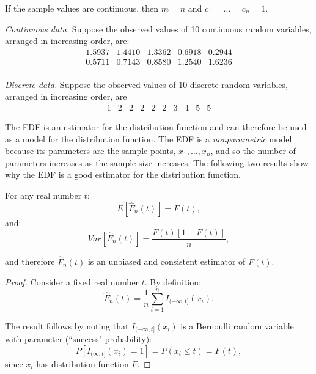 If the sample values are continuous, then $m = n$ and $c_1=\ldots=c_n=1$.

\begin{example}
{\it Continuous data.}
Suppose the observed values of 10 continuous random variables, arranged in increasing order, are:
$$\begin{array}{ccccc}
 1.5937     &   1.4410 &       1.3362&        0.6918 &      0.2944\\
0.5711	   &    0.7143&        0.8580&        1.2540  &      1.6236\\
\end{array}$$

\end{example}

\begin{example}
{\it Discrete data.}
Suppose the observed values of 10 discrete random variables, arranged in increasing order, are
$$\begin{array}{cccccccccc}
1 &    2&     2&     2&     2  &   2&     3&     4  &   5 &    5
\end{array}$$
\end{example}

The EDF is an estimator for the distribution function and can therefore be used as a model for the distribution function. The EDF is a {\it nonparametric} model because its parameters are the sample points, $x_1,\ldots,x_n$, and so the number of parameters increases as the sample size increases. The following two results show why the EDF is a good estimator for the distribution function.

\begin{prop}
For any real number $t$:
\begin{equation}
E[\hat{F}_n(t)]=F(t),
\end{equation}
and:
\begin{equation}
Var[\hat{F}_n(t)]=\frac{F(t)[1-F(t)]}{n},
\end{equation}

and therefore $\hat{F}_n(t)$ is an unbiased and consistent estimator of $F(t)$.

\begin{proof}
Consider a fixed real number $t$. By definition:
$$\hat{F}_n(t)=\frac{1}{n}\sum^n_{i=1}I_{(-\infty,t]}(x_i).$$

The result follows by noting that $I_{(-\infty,t]}(x_i)$ is a Bernoulli random variable with parameter (\textquotedblleft success" probability):
$$P[I_{(\infty,t]}(x_i)=1]=P(x_i\leq t)=F(t),$$
since $x_i$ has distribution function $F$.
\end{proof}
\end{prop}

